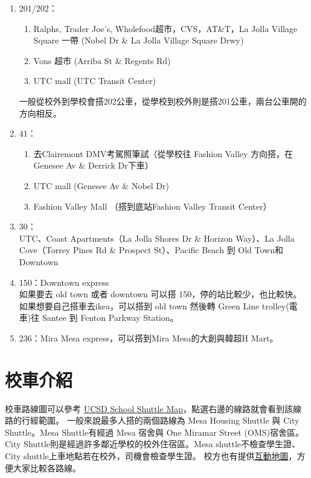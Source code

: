 \documentclass[10pt,a4paper]{book}
\begin{document}
\begin{CJK}{UTF8}{bkai}
\begin{enumerate}
\item 201/202：
\begin{enumerate}
    \item Ralphs, Trader Joe's, Wholefood超市，CVS，AT\&T，La Jolla Village Square 一帶 (Nobel Dr \& La Jolla Village Square Drwy)
    \item Vons 超市 (Arriba St \& Regents Rd)
    \item UTC mall (UTC Transit Center)
\end{enumerate}

一般從校外到學校會搭202公車，從學校到校外則是搭201公車，兩台公車開的方向相反。

\item 41：
\begin{enumerate}
    \item 去Clairemont DMV考駕照筆試（從學校往 Fashion Valley 方向搭，在 Genesee Av \& Derrick Dr下車）
    \item UTC mall (Genesee Av \& Nobel Dr)
    \item Fashion Valley Mall （搭到底站Fashion Valley Transit Center）
\end{enumerate}

\item 30：\\
UTC、Coast Apartments（La Jolla Shores Dr \& Horizon Way）、La Jolla Cove（Torrey Pines Rd \& Prospect St）、Pacific Beach 到 Old Town和Downtown


\item 150：Downtown express\\
如果要去 old town 或者 downtown 可以搭 150，停的站比較少，也比較快。如果想要自己搭車去ikea，可以搭到 old town 然後轉 Green Line trolley(電車)往 Santee 到 Fenton Parkway Station。

\item 236：Mira Mesa express，可以搭到Mira Mesa的大創與韓超H Mart。

\end{enumerate}

\section{校車介紹}
校車路線圖可以參考
\href{https://www.ucsdbus.com/map}{UCSD School Shuttle Map}，點選右邊的線路就會看到該線路的行經範圍。
一般來說最多人搭的兩個路線為 Mesa Housing Shuttle 與 City Shuttle。Mesa Shuttle有經過 Mesa 宿舍與 One Miramar Street (OMS)宿舍區。
City Shuttle則是經過許多鄰近學校的校外住宿區。Mesa shuttle不檢查學生證、City shuttle上車地點若在校外，司機會檢查學生證。
校方也有提供\href{http://www.ucsdbus.com/map}{互動地圖}，方便大家比較各路線。


\end{CJK}
\end{document}
